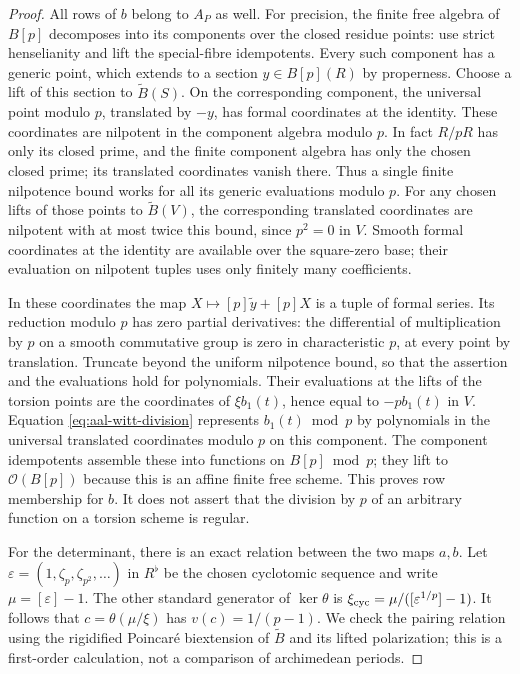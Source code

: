\begin{proof}
All rows of \(b\) belong to \(A_P\) as well. For precision, the
finite free algebra of \(B[p]\) decomposes into its components
over the closed residue points: use strict henselianity and lift
the special-fibre idempotents. Every such component has a
generic point, which extends to a section \(y\in B[p](R)\) by
properness. Choose a lift of this section to \(\widetilde B(S)\).
On the corresponding component, the universal point modulo \(p\),
translated by \(-y\), has formal coordinates at the identity.
These coordinates are nilpotent in the component algebra
modulo \(p\). In fact \(R/pR\) has only its closed prime, and
the finite component algebra has only the chosen closed prime;
its translated coordinates vanish there. Thus a single finite
nilpotence bound works for all its generic evaluations modulo
\(p\). For any chosen lifts of those points to \(\widetilde B(V)\),
the corresponding translated coordinates are nilpotent with at
most twice this bound, since \(p^2=0\) in \(V\).
Smooth formal coordinates at the identity are available over
the square-zero base; their evaluation on nilpotent tuples
uses only finitely many coefficients.

In these coordinates the map
\(X\mapsto [p]\widetilde y+[p]X\) is a tuple of formal series.
Its reduction modulo \(p\) has zero partial derivatives:
the differential of multiplication by \(p\) on a smooth
commutative group is zero in characteristic \(p\), at every
point by translation. Truncate beyond the uniform nilpotence
bound, so that the assertion and the evaluations hold for
polynomials. Their evaluations at the lifts of the torsion
points are the coordinates of \(\xi b_1(t)\), hence equal to
\(-p b_1(t)\) in \(V\). Equation
\eqref{eq:aal-witt-division} represents \(b_1(t)\bmod p\) by
polynomials in the universal translated coordinates modulo
\(p\) on this component. The component idempotents assemble
these into functions on \(B[p]\bmod p\); they lift to
\(\mathcal O(B[p])\) because this is an affine finite free
scheme. This proves row membership for \(b\). It does not
assert that the division by \(p\) of an arbitrary function
on a torsion scheme is regular.

For the determinant, there is an exact relation between the
two maps \(a,b\). Let \(\varepsilon=(1,\zeta_p,\zeta_{p^2},
\ldots)\) in \(R^\flat\) be the chosen cyclotomic sequence and
write \(\mu=[\varepsilon]-1\).
The other standard generator of \(\ker\theta\) is
\(\xi_{\rm cyc}=\mu/([\varepsilon^{1/p}]-1)\).
It follows that \(c=\theta(\mu/\xi)\) has
\(v(c)=1/(p-1)\).
We check the pairing relation using the rigidified Poincar\'e
biextension of \(\widetilde B\) and its lifted polarization;
this is a first-order calculation, not a comparison of
archimedean periods.


\end{proof}
